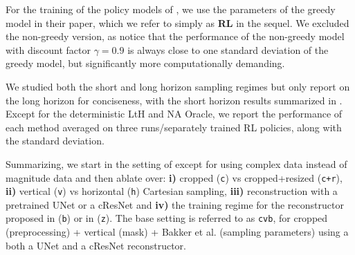 For the training of the policy models of \citet{bakker2020experimental}, we use the parameters of the greedy model in their paper, which we refer to simply as \textbf{RL} in the sequel. 
We excluded the non-greedy version, as \citet{bakker2020experimental} notice that the performance of the non-greedy model with discount factor $\gamma=0.9$ is always close to one standard deviation of the greedy model, but significantly more computationally demanding.



We studied both the short and long horizon sampling regimes but only report on the long horizon for conciseness, with the short horizon results summarized in . Except for the deterministic LtH and NA Oracle, we report the performance of each method averaged on three runs/separately trained RL policies, along with the standard deviation. 


\newcommand{\scrop}{(\texttt{c})}
\newcommand{\scropres}{(\texttt{c+r})}
\newcommand{\svert}{(\texttt{v})}
\newcommand{\shor}{(\texttt{h})}
\newcommand{\sbrate}{(\texttt{b})}
\newcommand{\szrate}{(\texttt{z})}

Summarizing, we start in the setting of \citet{bakker2020experimental} except for using complex data instead of magnitude data and then ablate over:
    \textbf{i)} cropped \scrop{} vs cropped+resized \scropres, \textbf{ii)} vertical \svert{} vs horizontal \shor{} Cartesian sampling, \textbf{iii)} reconstruction with a pretrained UNet  \citep{ronneberger2015u,bakker2020experimental} or a cResNet \citep{zhang2019reducing} and \textbf{iv)} the training regime for the reconstructor proposed in \citet{bakker2020experimental} \sbrate{} or in \citet{zhang2019reducing} \szrate.
The base setting is referred to as \texttt{cvb}, for cropped (preprocessing) + vertical (mask) + Bakker et al. (sampling parameters) using a both a UNet and a cResNet reconstructor.


